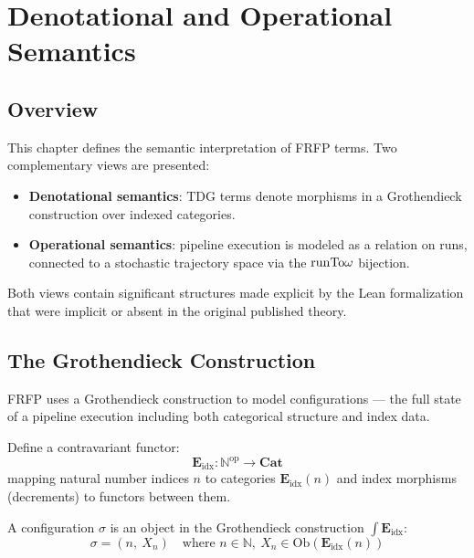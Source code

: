 \section{Denotational and Operational Semantics}
\label{ch:semantics}

\subsection{Overview}

This chapter defines the semantic interpretation of FRFP terms. Two complementary
views are presented:

\begin{itemize}
  \item \textbf{Denotational semantics}: TDG terms denote morphisms in a
        Grothendieck construction over indexed categories.
  \item \textbf{Operational semantics}: pipeline execution is modeled as a
        relation on runs, connected to a stochastic trajectory space via the
        $\mathrm{runTo}\omega$ bijection.
\end{itemize}

Both views contain significant structures made explicit by the Lean formalization
that were implicit or absent in the original published theory.

\subsection{The Grothendieck Construction}

FRFP uses a Grothendieck construction to model configurations --- the full state
of a pipeline execution including both categorical structure and index data.

\begin{definition}
Define a contravariant functor:
\[
  \mathbf{E}_{\mathrm{idx}} : \mathbb{N}^{\mathrm{op}} \to \mathbf{Cat}
\]
mapping natural number indices $n$ to categories $\mathbf{E}_{\mathrm{idx}}(n)$
and index morphisms (decrements) to functors between them.
\end{definition}

\begin{definition}
A configuration $\sigma$ is an object in the Grothendieck construction
$\int \mathbf{E}_{\mathrm{idx}}$:
\[
  \sigma = (n,\ X_n) \quad \text{where } n \in \mathbb{N},\
  X_n \in \mathrm{Ob}(\mathbf{E}_{\mathrm{idx}}(n))
\]
\end{definition}

